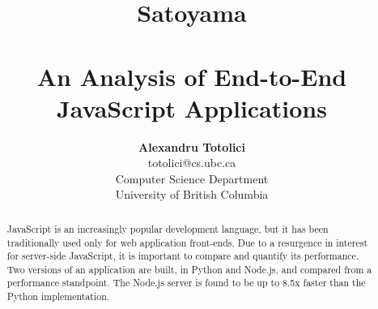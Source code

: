 \documentclass[letterpaper,twocolumn,10pt,final]{article}
\begin{document}
\date{}

\title{\selectfont
    {\huge{\textbf{Satoyama}}}\\
    {\large{\textbf{\\An Analysis of End-to-End JavaScript Applications}}}}


\author{
{\rm \textbf{Alexandru Totolici}}\\
{\rm totolici@cs.ubc.ca}\\
Computer Science Department\\
University of British Columbia\\
} %

\maketitle

\thispagestyle{empty}

\begin{abstract}
    JavaScript is an increasingly popular development language, but it has been traditionally used only for web application front-ends. Due to a resurgence in interest for server-side JavaScript, it is important to compare and quantify its performance. Two versions of an application are built, in Python and Node.js, and compared from a performance standpoint. The Node.js server is found to be up to 8.5x faster than the Python implementation.
\end{abstract}









%
%
%
%
%

{\footnotesize
    
    }
\end{document}
